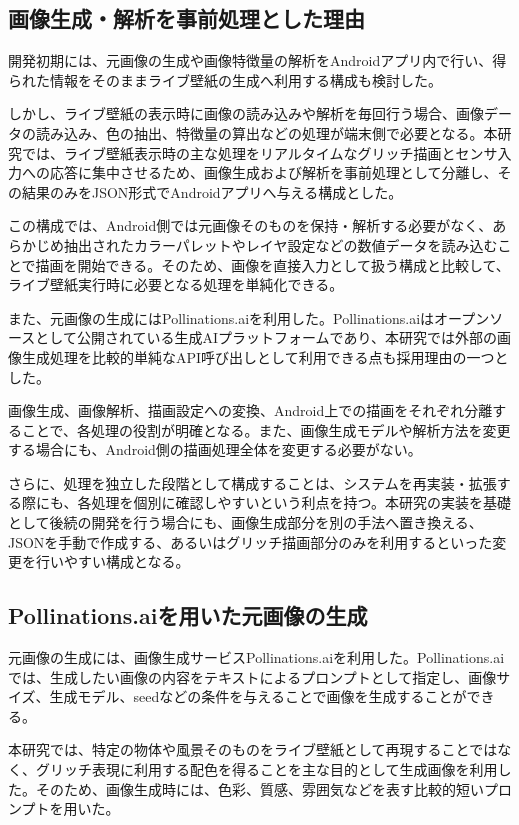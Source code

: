 \subsection{画像生成・解析を事前処理とした理由}

開発初期には、元画像の生成や画像特徴量の解析をAndroidアプリ内で行い、得られた情報をそのままライブ壁紙の生成へ利用する構成も検討した。

しかし、ライブ壁紙の表示時に画像の読み込みや解析を毎回行う場合、画像データの読み込み、色の抽出、特徴量の算出などの処理が端末側で必要となる。本研究では、ライブ壁紙表示時の主な処理をリアルタイムなグリッチ描画とセンサ入力への応答に集中させるため、画像生成および解析を事前処理として分離し、その結果のみをJSON形式でAndroidアプリへ与える構成とした。

この構成では、Android側では元画像そのものを保持・解析する必要がなく、あらかじめ抽出されたカラーパレットやレイヤ設定などの数値データを読み込むことで描画を開始できる。そのため、画像を直接入力として扱う構成と比較して、ライブ壁紙実行時に必要となる処理を単純化できる。

また、元画像の生成にはPollinations.aiを利用した。Pollinations.aiはオープンソースとして公開されている生成AIプラットフォームであり、本研究では外部の画像生成処理を比較的単純なAPI呼び出しとして利用できる点も採用理由の一つとした。

画像生成、画像解析、描画設定への変換、Android上での描画をそれぞれ分離することで、各処理の役割が明確となる。また、画像生成モデルや解析方法を変更する場合にも、Android側の描画処理全体を変更する必要がない。

さらに、処理を独立した段階として構成することは、システムを再実装・拡張する際にも、各処理を個別に確認しやすいという利点を持つ。本研究の実装を基礎として後続の開発を行う場合にも、画像生成部分を別の手法へ置き換える、JSONを手動で作成する、あるいはグリッチ描画部分のみを利用するといった変更を行いやすい構成となる。

\subsection{Pollinations.aiを用いた元画像の生成}

元画像の生成には、画像生成サービスPollinations.aiを利用した。Pollinations.aiでは、生成したい画像の内容をテキストによるプロンプトとして指定し、画像サイズ、生成モデル、seedなどの条件を与えることで画像を生成することができる。

本研究では、特定の物体や風景そのものをライブ壁紙として再現することではなく、グリッチ表現に利用する配色を得ることを主な目的として生成画像を利用した。そのため、画像生成時には、色彩、質感、雰囲気などを表す比較的短いプロンプトを用いた。

